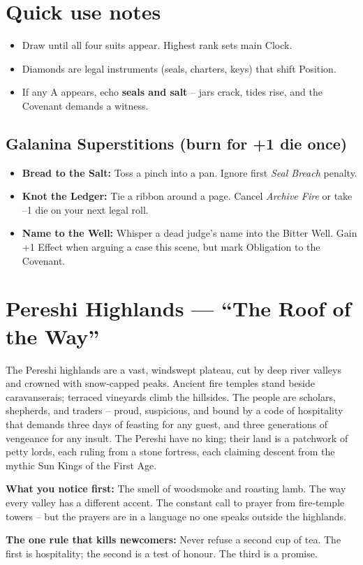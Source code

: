 \documentclass[11pt]{book}
\begin{document}
\section*{Quick use notes}
\begin{itemize}
\item Draw until all four suits appear. Highest rank sets main Clock.
\item Diamonds are legal instruments (seals, charters, keys) that shift Position.
\item If any A appears, echo \textbf{seals and salt} – jars crack, tides rise, and the Covenant demands a witness.
\end{itemize}

\subsection*{Galanina Superstitions (burn for +1 die once)}
\begin{itemize}
\item \textbf{Bread to the Salt:} Toss a pinch into a pan. Ignore first \textit{Seal Breach} penalty.
\item \textbf{Knot the Ledger:} Tie a ribbon around a page. Cancel \textit{Archive Fire} or take –1 die on your next legal roll.
\item \textbf{Name to the Well:} Whisper a dead judge’s name into the Bitter Well. Gain +1 Effect when arguing a case this scene, but mark Obligation to the Covenant.
\end{itemize}


\section{Pereshi Highlands — ``The Roof of the Way''}
\label{sec:pereshi}

\begin{tcolorbox}[colback=black!3,colframe=blue!60!black,title={Theme \& Atmosphere}]
The Pereshi highlands are a vast, windswept plateau, cut by deep river valleys and crowned with snow‑capped peaks. Ancient fire temples stand beside caravanserais; terraced vineyards climb the hillsides. The people are scholars, shepherds, and traders – proud, suspicious, and bound by a code of hospitality that demands three days of feasting for any guest, and three generations of vengeance for any insult. The Pereshi have no king; their land is a patchwork of petty lords, each ruling from a stone fortress, each claiming descent from the mythic Sun Kings of the First Age.

\vspace{2mm}
\textbf{What you notice first:} The smell of woodsmoke and roasting lamb. The way every valley has a different accent. The constant call to prayer from fire‑temple towers – but the prayers are in a language no one speaks outside the highlands.

\textbf{The one rule that kills newcomers:} Never refuse a second cup of tea. The first is hospitality; the second is a test of honour. The third is a promise.
\end{tcolorbox}
\end{document}
